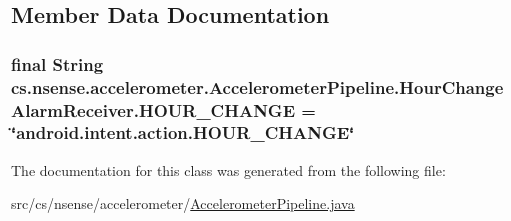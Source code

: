 \subsection{Member Data Documentation}
\hypertarget{classcs_1_1nsense_1_1accelerometer_1_1_accelerometer_pipeline_1_1_hour_change_alarm_receiver_a55dbfa9477826962bbb9a834da65f624}{
\subsubsection[{H\-O\-U\-R\-\_\-\-C\-H\-A\-N\-G\-E}]{\setlength{\rightskip}{0pt plus 5cm}final String cs.\-nsense.\-accelerometer.\-Accelerometer\-Pipeline.\-Hour\-Change\-Alarm\-Receiver.\-H\-O\-U\-R\-\_\-\-C\-H\-A\-N\-G\-E = \char`\"{}android.\-intent.\-action.\-H\-O\-U\-R\-\_\-\-C\-H\-A\-N\-G\-E\char`\"{}\hspace{0.3cm}{\ttfamily [static]}}}\label{classcs_1_1nsense_1_1accelerometer_1_1_accelerometer_pipeline_1_1_hour_change_alarm_receiver_a55dbfa9477826962bbb9a834da65f624}


The documentation for this class was generated from the following file\-:\begin{DoxyCompactItemize}
\item 
src/cs/nsense/accelerometer/\hyperlink{_accelerometer_pipeline_8java}{Accelerometer\-Pipeline.\-java}\end{DoxyCompactItemize}
